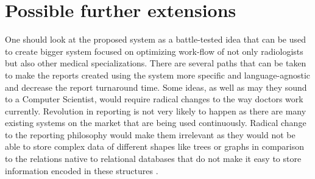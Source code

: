 \documentclass[12pt, twoside, openany]{report}
\theoremstyle{definition}
\begin{document}

\section{Possible further extensions}
One should look at the proposed system as a battle-tested idea that can be used to create bigger system focused on optimizing work-flow of not only radiologists but also other medical specializations. There are several paths that can be taken to make the reports created using the system more specific and language-agnostic and decrease the report turnaround time. Some ideas, as well as may they sound to a Computer Scientist, would require radical changes to the way doctors work currently. Revolution in reporting is not very likely to happen as there are many existing systems on the market that are being used continuously. Radical change to the reporting philosophy would make them irrelevant as they would not be able to store complex data of different shapes like trees or graphs in comparison to the relations native to relational databases that do not make it easy to store information encoded in these structures \cite{coelko-trees}. 
\end{document}
